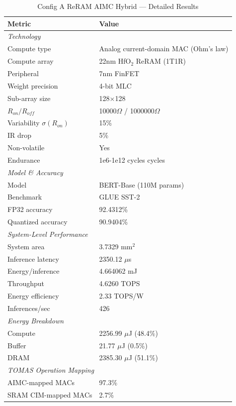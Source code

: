 \begin{table}[htbp]
\centering
\caption{Config A ReRAM AIMC Hybrid --- Detailed Results}
\label{tab:config_a_detail}
\begin{tabular}{ll}
\toprule
\textbf{Metric} & \textbf{Value} \\
\midrule
\multicolumn{2}{l}{\textit{Technology}} \\
\quad Compute type & Analog current-domain MAC (Ohm's law) \\
\quad Compute array & 22nm HfO$_2$ ReRAM (1T1R) \\
\quad Peripheral & 7nm FinFET \\
\quad Weight precision & 4-bit MLC \\
\quad Sub-array size & 128$\times$128 \\
\quad $R_{{on}}/R_{{off}}$ & 10000$\Omega$ / 1000000$\Omega$ \\
\quad Variability $\sigma(R_{{on}})$ & 15\% \\
\quad IR drop & 5\% \\
\quad Non-volatile & Yes \\
\quad Endurance & 1e6-1e12 cycles cycles \\
\midrule
\multicolumn{2}{l}{\textit{Model \& Accuracy}} \\
\quad Model & BERT-Base (110M params) \\
\quad Benchmark & GLUE SST-2 \\
\quad FP32 accuracy & 92.4312\% \\
\quad Quantized accuracy & 90.9404\% \\
\midrule
\multicolumn{2}{l}{\textit{System-Level Performance}} \\
\quad System area & 3.7329 mm$^2$ \\
\quad Inference latency & 2350.12 $\mu$s \\
\quad Energy/inference & 4.664062 mJ \\
\quad Throughput & 4.6260 TOPS \\
\quad Energy efficiency & 2.33 TOPS/W \\
\quad Inferences/sec & 426 \\
\midrule
\multicolumn{2}{l}{\textit{Energy Breakdown}} \\
\quad Compute & 2256.99 $\mu$J (48.4\%) \\
\quad Buffer & 21.77 $\mu$J (0.5\%) \\
\quad DRAM & 2385.30 $\mu$J (51.1\%) \\
\midrule
\multicolumn{2}{l}{\textit{TOMAS Operation Mapping}} \\
\quad AIMC-mapped MACs & 97.3\% \\
\quad SRAM CIM-mapped MACs & 2.7\% \\
\bottomrule
\end{tabular}
\end{table}
